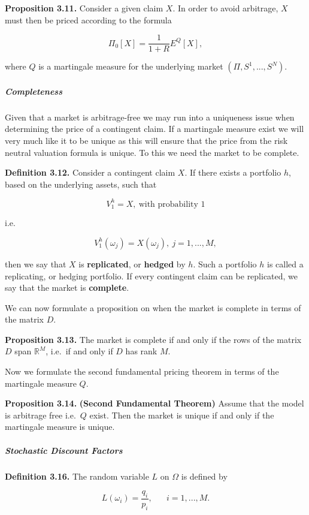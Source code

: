 \documentclass[
]{article}
\begin{document}
\textbf{Proposition 3.11.} Consider a given claim \(X\). In order to
avoid arbitrage, \(X\) must then be priced according to the formula

\[
\Pi_0[X]=\frac{1}{1+R}E^Q[X],\tag{3.10}
\]

where \(Q\) is a martingale measure for the underlying market
\((\Pi,S^1,...,S^N)\).

\hypertarget{completeness}{%
\subparagraph{Completeness}\label{completeness}}

Given that a market is arbitrage-free we may run into a uniqueness issue
when determining the price of a contingent claim. If a martingale
measure exist we will very much like it to be unique as this will ensure
that the price from the risk neutral valuation formula is unique. To
this we need the market to be complete.

\textbf{Definition 3.12.} Consider a contingent claim \(X\). If there
exists a portfolio \(h\), based on the underlying assets, such that

\[
V_1^h=X,\ \text{with probability 1}\tag{3.11}
\]

i.e.

\[
V_1^h(\omega_j)=X(\omega_j),\ j=1,...,M,\tag{3.12}
\]

then we say that \(X\) is \textbf{replicated}, or \textbf{hedged} by
\(h\). Such a portfolio \(h\) is called a replicating, or hedging
portfolio. If every contingent claim can be replicated, we say that the
market is \textbf{complete}.

We can now formulate a proposition on when the market is complete in
terms of the matrix \(D\).

\textbf{Proposition 3.13.} The market is complete if and only if the
rows of the matrix \(D\) span \(\mathbb{R}^M\), i.e.~if and only if
\(D\) has rank \(M\).

Now we formulate the second fundamental pricing theorem in terms of the
martingale measure \(Q\).

\textbf{Proposition 3.14.} \textbf{(Second Fundamental Theorem)} Assume
that the model is arbitrage free i.e.~\(Q\) exist. Then the market is
unique if and only if the martingale measure is unique.

\hypertarget{stochastic-discount-factors}{%
\subparagraph{Stochastic Discount
Factors}\label{stochastic-discount-factors}}

\textbf{Definition 3.16.} The random variable \(L\) on \(\Omega\) is
defined by

\[
L(\omega_i)=\frac{q_i}{p_i},\hspace{20pt} i=1,...,M.
\]
\end{document}
